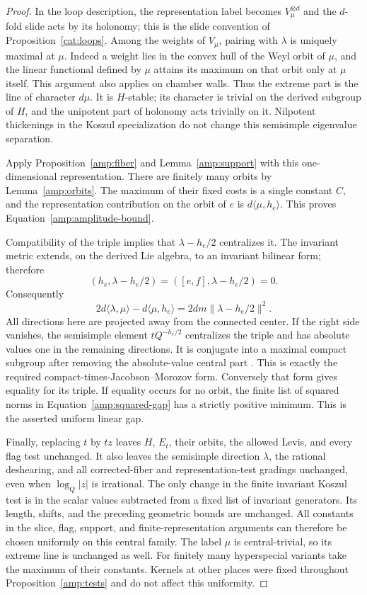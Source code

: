 \begin{proof}
In the loop description, the representation label becomes
$V_\mu^{\otimes d}$ and the $d$-fold slide acts by its holonomy;
this is the slide convention of Proposition~\ref{cat:loops}.
Among the weights of $V_\mu$, pairing with $\lambda$ is uniquely
maximal at $\mu$.  Indeed a weight lies in the convex hull of the
Weyl orbit of $\mu$, and the linear functional defined by $\mu$
attains its maximum on that orbit only at $\mu$ itself.
This argument also applies on chamber walls.
Thus the extreme part is the line of character $d\mu$.
It is $H$-stable; its character is trivial on the derived subgroup
of $H$, and the unipotent part of holonomy acts trivially on it.
Nilpotent thickenings in the Koszul specialization do not change
this semisimple eigenvalue separation.

Apply Proposition~\ref{amp:fiber} and
Lemma~\ref{amp:support} with this one-dimensional representation.
There are finitely many orbits by Lemma~\ref{amp:orbits}.
The maximum of their fixed costs is a single constant $C$,
and the representation contribution on the orbit of $e$ is
$d\langle\mu,h_e\rangle$.  This proves
Equation~\eqref{amp:amplitude-bound}.

Compatibility of the triple implies that
$\lambda-h_e/2$ centralizes it.  The invariant metric extends,
on the derived Lie algebra, to an invariant bilinear form;
therefore
\[
 (h_e,\lambda-h_e/2)
 =([e,f],\lambda-h_e/2)=0.
\]
Consequently
\begin{equation}
\label{amp:squared-gap}
 2d\langle\lambda,\mu\rangle
   -d\langle\mu,h_e\rangle
 =2dm\|\lambda-h_e/2\|^2.
\end{equation}
All directions here are projected away from the connected center.
If the right side vanishes, the semisimple element
$tQ^{-h_e/2}$ centralizes the triple and has absolute values one
in the remaining directions.  It is conjugate into a maximal
compact subgroup after removing the absolute-value central part
\cite[Theorems~3.6 and~3.7]{AdamsTaibiCohomology}.
This is exactly the required compact-times-Jacobson--Morozov form.
Conversely that form gives equality for its triple.
If equality occurs for no orbit, the finite list of squared norms
in Equation~\eqref{amp:squared-gap} has a strictly positive minimum.
This is the asserted uniform linear gap.

Finally, replacing $t$ by $tz$ leaves $H$, $E_t$, their orbits,
the allowed Levis, and every flag test unchanged.  It also leaves
the semisimple direction $\lambda$, the rational deshearing,
and all corrected-fiber and representation-test gradings unchanged,
even when $\log_Q|z|$ is irrational.  The only change
in the finite invariant Koszul test is in the scalar values
subtracted from a fixed list of invariant generators.
Its length, shifts, and the preceding geometric bounds are
unchanged.  All constants in the slice, flag, support, and
finite-representation arguments can therefore be chosen uniformly
on this central family.  The label $\mu$ is central-trivial, so
its extreme line is unchanged as well.
For finitely many hyperspecial variants take the maximum of their
constants.  Kernels at other places were fixed throughout
Proposition~\ref{amp:tests} and do not affect this uniformity.
\end{proof}
